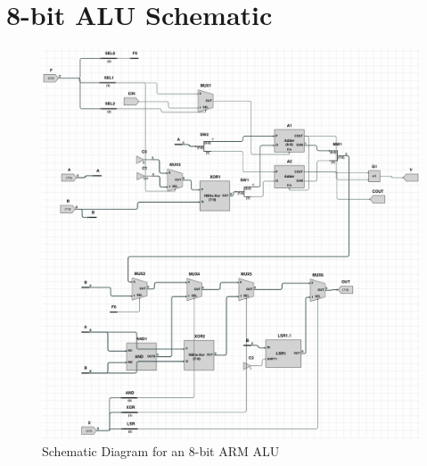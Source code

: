 \chapter{8-bit ALU Schematic} \label{app:alu}
\begin{figure}
    \centering
    \includegraphics[width=\textwidth]{Appendices/alu8bit.png}
    \caption{Schematic Diagram for an 8-bit ARM ALU}
    \label{fig:alu8bit}
\end{figure}
